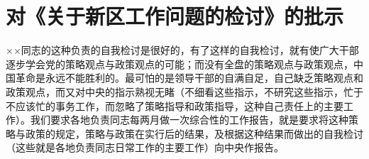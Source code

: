 \section[对《关于新区工作问题的检讨》的批示（一九四八年四月）]{对《关于新区工作问题的检讨》的批示}


××同志的这种负责的自我检讨是很好的，有了这样的自我检讨，就有使广大干部逐步学会党的策略观点与政策观点的可能；而没有全盘的策略观点与政策观点，中国革命是永远不能胜利的。最可怕的是领导干部的自满自足，自己缺乏策略观点和政策观点，而又对中央的指示熟视无睹（不细看这些指示，不研究这些指示，忙于不应该忙的事务工作，而忽略了策略指导和政策指导，这种自己责任上的主要工作）。我们要求各地负责同志每两月做一次综合性的工作报告，就是要求将这种策略与政策的规定，策略与政策在实行后的结果，及根据这种结果而做出的自我检讨（这些就是各地负责同志日常工作的主要工作）向中央作报告。

